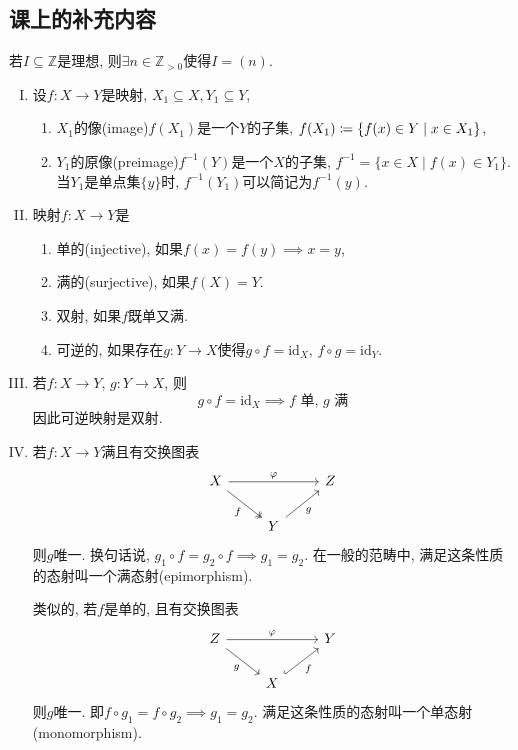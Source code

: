 \documentclass{../solutions-cn}
\begin{document}
\subsection*{课上的补充内容}
\begin{additional}
    若$I \subseteq \mathbb{Z}$是理想, 则$\exists n \in \mathbb{Z}_{>0}$使得$I = (n)$.
\end{additional}

\begin{additional}[集合论相关]
    \begin{enumerate}[I.]
        \item 设$f: X \to Y$是映射, $X_1 \subseteq X, Y_1 \subseteq Y$,
        \begin{enumerate}[(1)]
            \item $X_1$的像(image)$f(X_1)$是一个$Y$的子集, $f(X_1) \mathrel{\coloneqq} \{f(x) \in Y \mid x \in X_1\}$,
            \item $Y_1$的原像(preimage)$f^{-1}(Y)$是一个$X$的子集, $f^{-1} = \{x \in X \mid f(x) \in Y_1\}$. 当$Y_1$是单点集$\{y\}$时, $f^{-1}(Y_1)$可以简记为$f^{-1}(y)$.
        \end{enumerate}
        \item 映射$f: X \to Y$是
        \begin{enumerate}[(1)]
            \item 单的(injective), 如果$f(x) = f(y) \implies x = y$,
            \item 满的(surjective), 如果$f(X) = Y$.
            \item 双射, 如果$f$既单又满.
            \item 可逆的, 如果存在$g: Y \to X$使得$g \circ f = \mathrm{id}_X,\, f \circ g = \mathrm{id}_Y$.
        \end{enumerate}
        \item 若$f: X \to Y$, $g: Y \to X$, 则
        \[
            g \circ f = \mathrm{id}_X \implies f \text{ 单},\, g \text{ 满}
        \]
        因此可逆映射是双射.
        \item 若$f: X \to Y$满且有交换图表
        \[
            \begin{tikzcd}
                X \arrow[rr, "\varphi"] \arrow[rd, "f"', two heads] &                    & Z \\
                                                                & Y \arrow[ru, "g"'] &  
            \end{tikzcd}
        \]
        则$g$唯一. 换句话说, $g_1 \circ f = g_2 \circ f \implies g_1 = g_2$. 在一般的范畴中, 满足这条性质的态射叫一个满态射(epimorphism).

        类似的, 若$f$是单的, 且有交换图表
        \[
            \begin{tikzcd}
                Z \arrow[rr, "\varphi"] \arrow[rd, "g"'] &                          & Y \\
                                                        & X \arrow[ru, "f"', hook] &  
            \end{tikzcd}
        \]
        则$g$唯一. 即$f \circ g_1 = f \circ g_2 \implies g_1 = g_2$. 满足这条性质的态射叫一个单态射(monomorphism).
    \end{enumerate}
\end{additional}
\end{document}
